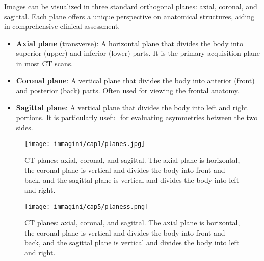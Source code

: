 Images can be visualized in three standard orthogonal planes: axial, coronal, and sagittal. Each plane offers a unique perspective on anatomical structures, aiding in comprehensive clinical assessment.

\begin{itemize}
    \item \textbf{Axial plane} (transverse): A horizontal plane that divides the body into superior (upper) and inferior (lower) parts. It is the primary acquisition plane in most CT scans.
    
    \item \textbf{Coronal plane}: A vertical plane that divides the body into anterior (front) and posterior (back) parts. Often used for viewing the frontal anatomy.
    
    \item \textbf{Sagittal plane}: A vertical plane that divides the body into left and right portions. It is particularly useful for evaluating asymmetries between the two sides.
\end{itemize}

\begin{figure}[h!]
    \centering
    \texttt{[image: immagini/cap1/planes.jpg]}
    \caption{CT planes: axial, coronal, and sagittal. The axial plane is horizontal, the coronal plane is vertical and divides the body into front and back, and the sagittal plane is vertical and divides the body into left and right.}
    \label{fig:ct_planes}
\end{figure}


\begin{figure}[h!]
    \centering
    \texttt{[image: immagini/cap5/planess.png]}
    \caption{CT planes: axial, coronal, and sagittal. The axial plane is horizontal, the coronal plane is vertical and divides the body into front and back, and the sagittal plane is vertical and divides the body into left and right.}
    \label{fig:planes}
\end{figure}